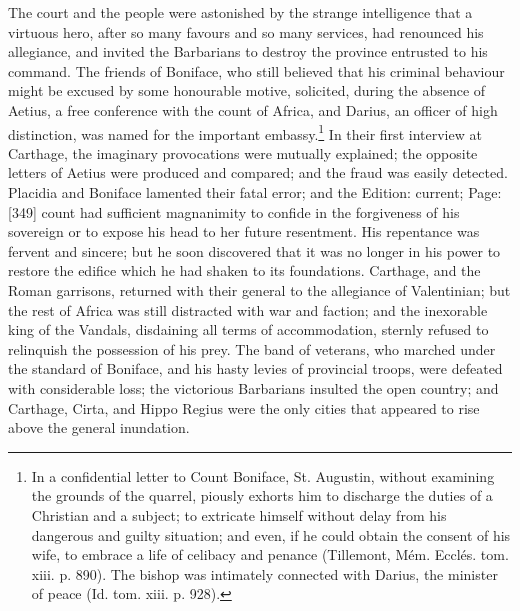 The court and the people were astonished by the strange intelligence that a virtuous hero, after so many favours and so many services, had renounced his allegiance, and invited the Barbarians to destroy the province entrusted to his command. The friends of Boniface, who still believed that his criminal behaviour might be excused by some honourable motive, solicited, during the absence of Aetius, a free conference with the count of Africa, and Darius, an officer of high distinction, was named for the important embassy.\footnote{In a confidential letter to Count Boniface, St. Augustin, without examining the grounds of the quarrel, piously exhorts him to discharge the duties of a Christian and a subject; to extricate himself without delay from his dangerous and guilty situation; and even, if he could obtain the consent of his wife, to embrace a life of celibacy and penance (Tillemont, Mém. Ecclés. tom. xiii. p. 890). The bishop was intimately connected with Darius, the minister of peace (Id. tom. xiii. p. 928).} In their first interview at Carthage, the imaginary provocations were mutually explained; the opposite letters of Aetius were produced and compared; and the fraud was easily detected. Placidia and Boniface lamented their fatal error; and the Edition: current; Page: [349] count had sufficient magnanimity to confide in the forgiveness of his sovereign or to expose his head to her future resentment. His repentance was fervent and sincere; but he soon discovered that it was no longer in his power to restore the edifice which he had shaken to its foundations. Carthage, and the Roman garrisons, returned with their general to the allegiance of Valentinian; but the rest of Africa was still distracted with war and faction; and the inexorable king of the Vandals, disdaining all terms of accommodation, sternly refused to relinquish the possession of his prey. The band of veterans, who marched under the standard of Boniface, and his hasty levies of provincial troops, were defeated with considerable loss; the victorious Barbarians insulted the open country; and Carthage, Cirta, and Hippo Regius were the only cities that appeared to rise above the general inundation.

